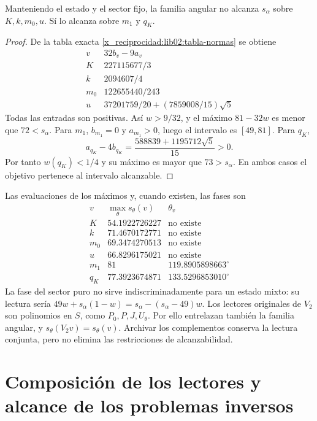 \begin{corollary}
\label{x_reciprocidad:lib02:seis-angulares}
Manteniendo el estado y el sector fijo, la familia angular no alcanza
\(s_\alpha\) sobre \(K,k,m_0,u\). Sí lo alcanza sobre
\(m_1\) y \(q_K\).
\end{corollary}
\begin{proof}
De la tabla exacta \eqref{x_reciprocidad:lib02:tabla-normas} se obtiene
\[
\begin{array}{c|c}
 v&32b_v-9a_v\\\hline
 K&227115677/3\\
 k&2094607/4\\
 m_0&122655440/243\\
 u&37201759/20+(7859008/15)\sqrt5
\end{array}
\]
Todas las entradas son positivas. Así \(w>9/32\), y el máximo
\(81-32w\) es menor que \(72<s_\alpha\). Para \(m_1\),
\(b_{m_1}=0\) y \(a_{m_1}>0\), luego el intervalo es
\([49,81]\). Para \(q_K\),
\[
 a_{q_K}-4b_{q_K}=\frac{588839+1195712\sqrt5}{15}>0.
\]
Por tanto \(w(q_K)<1/4\) y su máximo es mayor que
\(73>s_\alpha\). En ambos casos el objetivo pertenece al
intervalo alcanzable.
\end{proof}

Las evaluaciones de los máximos y, cuando existen, las fases son
\[
\begin{array}{c|c|c}
 v&\max_\theta s_\theta(v)&\theta_v\\\hline
 K&54.1922726227&\text{no existe}\\
 k&71.4670172771&\text{no existe}\\
 m_0&69.3474270513&\text{no existe}\\
 u&66.8296175021&\text{no existe}\\
 m_1&81&119.8905898663^\circ\\
 q_K&77.3923674871&133.5296853010^\circ
\end{array}
\]
La fase del sector puro no sirve indiscriminadamente para un estado
mixto: su lectura sería
\(49w+s_\alpha(1-w)=s_\alpha-(s_\alpha-49)w\).
Los lectores originales de \(V_2\) son polinomios en \(S\), como
\(P_0,P,J,U_\theta\). Por ello entrelazan también la familia
angular, y \(s_\theta(V_2v)=s_\theta(v)\). Archivar los
complementos conserva la lectura conjunta, pero no elimina las
restricciones de alcanzabilidad.

\section{Composición de los lectores y alcance de los problemas inversos}
\label{x_reciprocidad:lib02:alcance}

